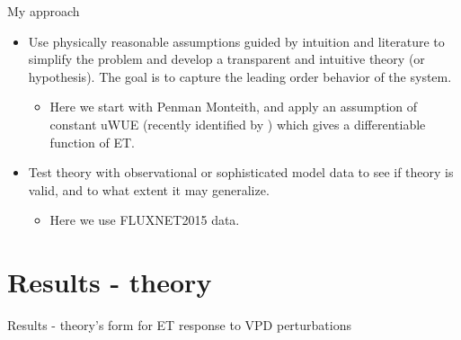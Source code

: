 \documentclass{beamer}
\begin{document}
\begin{frame}{My approach}
  \begin{itemize}
  \item Use physically reasonable assumptions guided by intuition and literature to simplify the problem and develop a transparent and intuitive theory (or hypothesis). The goal is to capture the leading order behavior of the system.
    \begin{itemize}
    \item Here we start with Penman Monteith, and apply an assumption of constant uWUE (recently identified by \cite{Zhou_2016}) which gives a differentiable function of ET.
    \end{itemize}
  \item Test theory with observational or sophisticated model data to see if theory is valid, and to what extent it may generalize.
    \begin{itemize}
    \item Here we use FLUXNET2015 data.
    \end{itemize}
  \end{itemize}
\end{frame}

\section{Results - theory}
\begin{frame}{Results - theory's form for ET response to VPD perturbations}
\end{frame}
\end{document}
